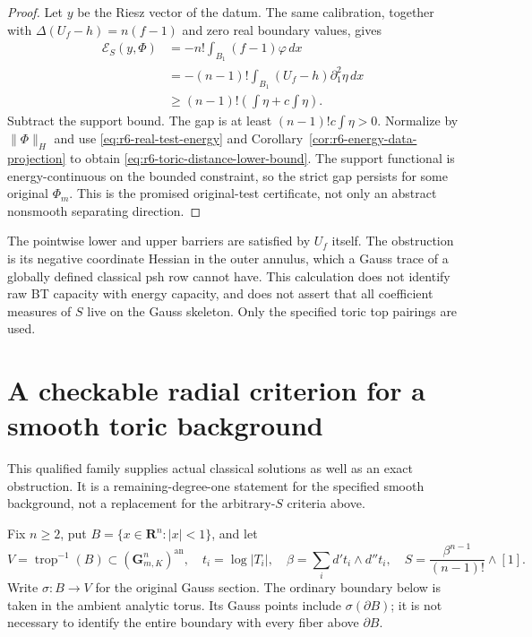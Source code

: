 \documentclass[11pt,a4paper]{article}
\numberwithin{equation}{section}
\theoremstyle{definition}
\theoremstyle{remark}
\newcommand{\an}{\mathrm{an}}
\begin{document}
\begin{proof}
Let $y$ be the Riesz vector of the datum. The same calibration, together
with $\Delta(U_f-h)=n(f-1)$ and zero real boundary values, gives
\begin{align*}
 \mathcal E_S(y,\Phi)
    &=-n!\int_{B_1}(f-1)\varphi\,dx\\
    &=-(n-1)!\int_{B_1}(U_f-h)\partial_1^2\eta\,dx\\
    &\ge(n-1)!\left(\int\eta+c\int\eta\right).
\end{align*}
Subtract the support bound. The gap is at least
$(n-1)!c\int\eta>0$. Normalize by $\|\Phi\|_H$ and use
\eqref{eq:r6-real-test-energy} and
Corollary~\ref{cor:r6-energy-data-projection} to obtain
\eqref{eq:r6-toric-distance-lower-bound}.
The support functional is energy-continuous on the bounded constraint,
so the strict gap persists for some original $\Phi_m$. This is the
promised original-test certificate, not only an abstract nonsmooth
separating direction.
\end{proof}

The pointwise lower and upper barriers are satisfied by $U_f$ itself.
The obstruction is its negative coordinate Hessian in the outer annulus,
which a Gauss trace of a globally defined classical psh row cannot have.
This calculation does not identify raw BT capacity with energy capacity,
and does not assert that all coefficient measures of $S$ live on the
Gauss skeleton. Only the specified toric top pairings are used.



\section{A checkable radial criterion for a smooth toric background}
\label{sec:r6-radial-toric-dirichlet}

This qualified family supplies actual classical solutions as well as
an exact obstruction. It is a remaining-degree-one statement for the
specified smooth background, not a replacement for the arbitrary-$S$
criteria above.

Fix $n\ge2$, put $B=\{x\in\mathbf R^n:|x|<1\}$, and let
\[
 V=\operatorname{trop}^{-1}(B)\subset(\mathbf G_{m,K}^n)^{\an},
 \quad t_i=\log|T_i|,\quad
 \beta=\sum_i d't_i\wedge d''t_i,\quad
 S=\frac{\beta^{n-1}}{(n-1)!}\wedge[1].
\]
Write $\sigma:B\to V$ for the original Gauss section. The ordinary
boundary below is taken in the ambient analytic torus. Its Gauss
points include $\sigma(\partial B)$; it is not necessary to identify
the entire boundary with every fiber above $\partial B$.
\end{document}
